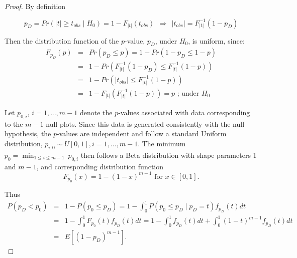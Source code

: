 \documentclass[12pt]{article}
\begin{document}
\begin{proof}

 By definition  

$$p_D=Pr\left(|t| \ge t_{obs} \mid H_0\right)=1-F_{|t|}(t_{obs}) \ \ \Rightarrow \ \  |t_{obs}|=F_{|t|}^{-1}(1-p_D)$$

\noindent Then the distribution function of the $p$-value, $p_D$, under $H_0$, is uniform, since:  
\begin{eqnarray}\label{dist_p}
F_{p_D}(p) &=& Pr(p_D \le p)=1-Pr(1-p_D \le 1-p) \nonumber \\
  &=& 1-Pr\left(F_{|t|}^{-1}(1-p_D) \le F_{|t|}^{-1}(1-p) \right) \nonumber \\
  &=& 1-Pr\left(|t_{obs}| \le F_{|t|}^{-1}(1-p)\right) \nonumber \\
  &=&%
          1-F_{|t|}\left( F_{|t|}^{-1}(1-p)\right)=p \mbox{ ; under $H_0$} 
\end{eqnarray}




Let $p_{0,i}$, $i=1, ..., m-1$ denote the  $p$-values associated with data corresponding to the $m-1$ null plots. Since this data is generated consistently with the null hypothesis,  the $p$-values are independent and  follow a standard Uniform distribution, $p_{i,0} \sim U[0,1], i= 1, ..., m-1$. The minimum $p_0 = \min_{1 \le i \le m-1}  \ p_{0,i}$ then follows a Beta distribution with shape parameters 1 and $m-1$, and corresponding distribution function 
\[
F_{p_0} (x) =  1- (1- x) ^{m-1}  \text{ for } x \in [0,1].
\]

\noindent Thus
\begin{eqnarray*}
P(p_D < p_{0}) &=& 1 - P(p_{0} \le p_D) = 1- \int_0^1  P(p_{0} \le p_D \mid p_D=t) f_{p_D}(t) dt   \\
&=& 1 - \int_0^1 F_{p_{0}}(t) f_{p_D}(t) dt = 1 - \int_0^1 f_{p_D}(t) dt + \int_0^1 (1-t)^{m-1} f_{p_D}(t) dt  \\
&=&  E\left[ (1 - p_D)^{m-1}\right].
\end{eqnarray*}



\end{proof}
\end{document}
